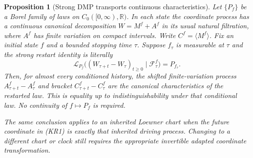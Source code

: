 \documentclass[11pt]{article}
\newtheorem{proposition}[theorem]{Proposition}
\theoremstyle{definition}\newtheorem{definition}[theorem]{Definition}
\theoremstyle{remark}\newtheorem{remark}[theorem]{Remark}
\begin{document}
\begin{proposition}[Strong DMP transports continuous characteristics]
\label{prop:automatic-characteristics}
Let $\{P_f\}$ be a Borel family of laws on
$C_0([0,\infty),\mathbb R)$. In each state the coordinate process has a
continuous canonical decomposition $W=M^f+A^f$ in its usual natural
filtration, where $A^f$ has finite variation on compact intervals. Write
$C^f=\langle M^f\rangle$. Fix an initial state $f$ and a bounded stopping
time $\tau$. Suppose $f_\tau$ is measurable at $\tau$ and the strong restart
identity is literally
\[
 \mathcal L_{P_f}\bigl((W_{\tau+t}-W_\tau)_{t\ge0}
                  \mid\mathcal F^f_\tau\bigr)=P_{f_\tau}.
 \tag{KR1}
\]
Then, for almost every conditioned history, the shifted finite-variation
process $A^f_{\tau+t}-A^f_\tau$ and bracket
$C^f_{\tau+t}-C^f_\tau$ are the canonical characteristics of the restarted
law. This is equality up to indistinguishability under that conditional
law. No continuity of $f\mapsto P_f$ is required.

The same conclusion applies to an inherited Loewner chart when the future
coordinate in (KR1) is exactly that inherited driving process. Changing to
a different chart or clock still requires the appropriate invertible
adapted coordinate transformation.
\end{proposition}
\end{document}
